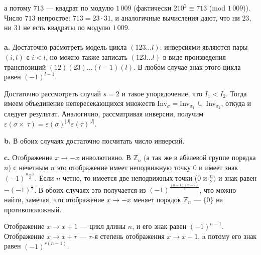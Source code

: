 \documentclass{mai_book}
\begin{document}
а потому $713$ --- квадрат по модулю $1\,009$ (фактически $210^2 \equiv 713$ (mod $1\,009$)). Число $713$ непростое: $713 = 23 \cdot 31$, и аналогичные  вычисления дают, что ни $23$, ни $31$ не есть квадраты по модулю $1\,009$. \\

 \\

\textbf{a. } Достаточно расмотреть модель цикла $(123\ldots l)$: инверсиями являются пары $(i,l)$ с $i < l$, но можно также записать $(123\ldots l)$ в виде произведения транспозиций $(12)(23)\ldots (l-1)(l)$. В любом случае знак этого цикла равен $(-1)^{l-1}$. \par
Достаточно рассмотреть случай $s = 2$ и такое упорядочение, что $I_1 < I_2$. Тогда имеем объединение непересекающихся множеств Inv$_{\sigma} = $Inv$_{{\sigma}_1}~\cup~$Inv$_{{\sigma}_2}$, откуда и следует результат. Аналогично, рассматривая инверсии, получим ${\varepsilon} (\sigma \times \ \tau) = \varepsilon (\sigma)^{|J|} \varepsilon (\tau)^{|I|}$. \smallskip

\textbf{b. } В обоих случаях достаточно посчитать число инверсий. \smallskip

\textbf{c. } Отображение $x \to -x$ инволютивно. В $\mathbb{Z}_n$ (а так же в абелевой группе порядка $n$) с нечетным $n$ это отображение имеет неподвижную точку $0$ и имеет знак $(-1)^{\frac{n-1}{2}}$. Если $n$ четно, то имеется две неподвижных точки ($0$ и $\frac{n}{2})$ и знак равен $-(-1)^{\frac{n}{2}}$. В обоих случаях это получается из $(-1)^{\frac{(n-1)(n-2)}{2}}$, что можно найти, замечая, что отображение $x \to -x$ меняет порядок $\mathbb{Z}_n$ --- $\{0\}$ на противоположный.\par
Отображение $x \to x+1$ --- цикл длины $n$, и его знак равен $(-1)^{n-1}$. Отображение $x \to x+r$ --- $r$-я степень отображения $x \to x+1$, a потому его знак равен $(-1)^{r(n-1)}$. \smallskip
\end{document}
